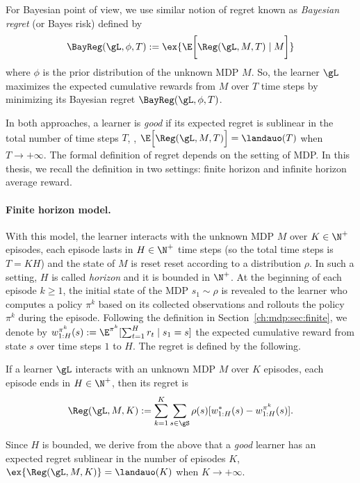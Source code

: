 For Bayesian point of view, we use similar notion of regret known as \emph{Bayesian regret} (or Bayes risk) defined by
\begin{equation}
    \label{eq:bayes_rg}
    \BayReg(\gL, \phi, T):=\ex{\E\bigg[\Reg(\gL, M, T) \mid M\bigg]}
\end{equation}
where $\phi$ is the prior distribution of the unknown MDP $M$.
So, the learner $\gL$ maximizes the expected cumulative rewards from $M$ over $T$ time steps by minimizing its Bayesian regret $\BayReg(\gL, \phi, T)$.

In both approaches, a learner is \emph{good} if its expected regret is sublinear in the total number of time steps $T$, \ie, $\E\Big[\Reg(\gL, M, T)\Big]= \landauo(T)$ when $T\to+\infty$.
The formal definition of regret depends on the setting of MDP.
In this thesis, we recall the definition in two settings: finite horizon and infinite horizon average reward.


\paragraph{Finite horizon model.}
With this model, the learner interacts with the unknown MDP $M$ over $K\in\N^+$ episodes, each episode lasts in $H\in\N^+$ time steps (so the total time steps is $T=KH$) and the state of $M$ is reset reset according to a distribution $\rho$.
In such a setting, $H$ is called \emph{horizon} and it is bounded in $\N^+$.
At the beginning of each episode $k\ge1$, the initial state of the MDP $s_1\sim\rho$ is revealed to the learner who computes a policy $\pi^k$ based on its collected observations and rollouts the policy $\pi^k$ during the episode.
Following the definition in Section~\ref{ch:mdp:sec:finite}, we denote by $w^{\pi^k}_{1:H}(s):=\E^{\pi^k}[\sum_{t=1}^{H}r_t \mid s_1=s]$ the expected cumulative reward from state $s$ over time steps $1$ to $H$.
The regret is defined by the following.
\begin{defn}
    \label{defn:rg_finite}
    If a learner $\gL$ interacts with an unknown MDP $M$ over $K$ episodes, each episode ends in $H\in\N^+$, then its regret is
    \begin{equation}
        \label{eq:rg_finite}
        \Reg(\gL, M, K):= \sum_{k=1}^K\sum_{s\in\gS}\rho(s)[w^*_{1:H}(s) -w^{\pi^k}_{1:H}(s)].
    \end{equation}
\end{defn}
Since $H$ is bounded, we derive from the above that a \emph{good} learner has an expected regret sublinear in the number of episodes $K$, $\ex{\Reg(\gL, M, K)}=\landauo(K)$ when $K\to+\infty$.


